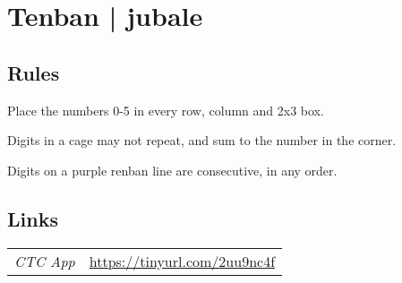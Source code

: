 \section[Tenban | jubale {[\emph{Sudoku/Renban,Killer}]}]{Tenban | {\normalfont jubale}}
\label{sec:44-tenban-jubale}

\subsection*{Rules}
\begin{markdown}
Place the numbers 0-5 in every row, column and 2x3 box.



Digits in a cage may not repeat, and sum to the number in the corner.



Digits on a purple renban line are consecutive, in any order.
\end{markdown}
\subsection*{Links}
\begin{tabularx}{\textwidth}{l X}
\emph{CTC App} & \url{https://tinyurl.com/2uu9nc4f} \\
\end{tabularx}
\pagebreak
